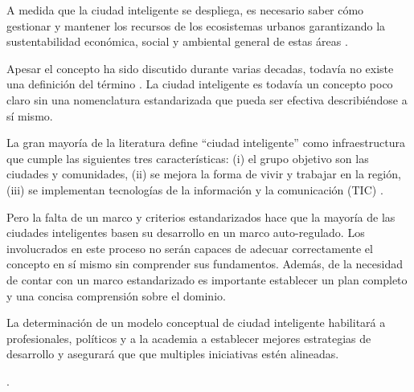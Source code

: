 \documentclass[runningheads,a4paper,spanish]{llncs}
\begin{document}
A medida que
la ciudad inteligente se despliega, es necesario saber cómo
gestionar y mantener los recursos de los ecosistemas urbanos
garantizando la sustentabilidad económica,
social y ambiental general de estas áreas \cite{aljowder_systematic_2019,stubinger_understanding_2020}.

Apesar el concepto ha sido discutido durante varias decadas,
todavía no existe una definición del término
\cite{wahab_systematic_2020}.
La ciudad inteligente es todavía un
concepto poco claro sin una nomenclatura estandarizada que pueda ser
efectiva describiéndose a sí mismo.

La gran mayoría de la literatura define “ciudad inteligente” como
infraestructura que cumple las siguientes tres características:
(i) el grupo objetivo son las ciudades y comunidades,
(ii) se mejora la forma de vivir y trabajar en la región,
(iii) se implementan tecnologías de la información y la comunicación (TIC)
\cite{stubinger_understanding_2020}.

Pero la falta de un marco y criterios estandarizados
hace que la mayoría de las ciudades inteligentes basen su
desarrollo en un marco auto-regulado.
Los involucrados en este proceso
no serán capaces de adecuar correctamente el concepto
en sí mismo sin comprender sus fundamentos.
Además, de la necesidad de contar con un marco estandarizado
es importante establecer un plan completo y
una concisa comprensión sobre el dominio.


La determinación de un modelo conceptual de ciudad inteligente habilitará a
profesionales, políticos y a la academia a establecer mejores estrategias de
desarrollo y asegurará que que multiples iniciativas estén alineadas.

.

\end{document}
